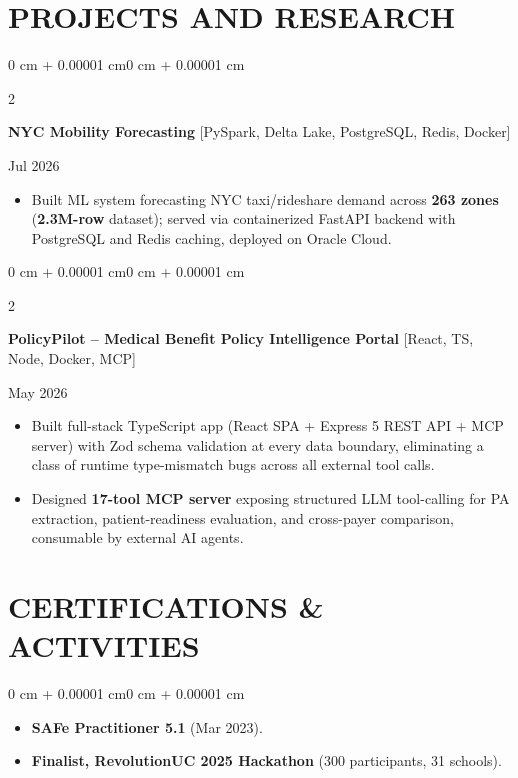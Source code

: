\documentclass[10pt, letterpaper]{article}
\newenvironment{highlights}{
    \begin{itemize}[
        topsep=0.10 cm,
        parsep=0.06 cm,
        partopsep=0pt,
        itemsep=0.06 cm,
        leftmargin=12pt
    ]
}{
    \end{itemize}
}
\newenvironment{onecolentry}{
    \begin{adjustwidth}{0 cm + 0.00001 cm}{0 cm + 0.00001 cm}
}{
    \end{adjustwidth}
}
\newenvironment{twocolentry}[2][]{
    \onecolentry
    \def\secondColumn{#2}
    \setcolumnwidth{\fill, 4.5 cm}
    \begin{paracol}{2}
}{
    \switchcolumn \raggedleft \secondColumn
    \end{paracol}
    \endonecolentry
}
\begin{document}
\section{PROJECTS AND RESEARCH}
\begin{twocolentry}{Jul 2026}
\textbf{NYC Mobility Forecasting} [PySpark, Delta Lake, PostgreSQL, Redis, Docker]
\end{twocolentry}
\begin{highlights}
  \item Built ML system forecasting NYC taxi/rideshare demand across \textbf{263 zones} (\textbf{2.3M-row} dataset); served via containerized FastAPI backend with PostgreSQL and Redis caching, deployed on Oracle Cloud.
\end{highlights}

\vspace{0.12 cm}

\begin{twocolentry}{May 2026}
\textbf{PolicyPilot -- Medical Benefit Policy Intelligence Portal} [React, TS, Node, Docker, MCP]
\end{twocolentry}
\begin{highlights}
  \item Built full-stack TypeScript app (React SPA + Express 5 REST API + MCP server) with Zod schema validation at every data boundary, eliminating a class of runtime type-mismatch bugs across all external tool calls.
  \item Designed \textbf{17-tool MCP server} exposing structured LLM tool-calling for PA extraction, patient-readiness evaluation, and cross-payer comparison, consumable by external AI agents.
\end{highlights}

\section{CERTIFICATIONS \& ACTIVITIES}
\begin{onecolentry}
\begin{highlights}
  \item \textbf{SAFe Practitioner 5.1} (Mar 2023).
  \item \textbf{Finalist, RevolutionUC 2025 Hackathon} (300 participants, 31 schools).
\end{highlights}
\end{onecolentry}
\end{document}
